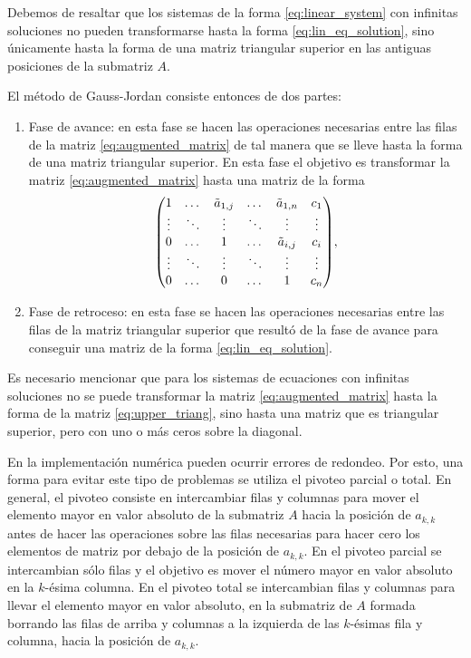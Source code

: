 \documentclass[11pt,letterpaper]{article}
\begin{document}
Debemos de resaltar que los sistemas de la forma 
\eqref{eq:linear_system} con infinitas soluciones no pueden transformarse hasta la 
forma \eqref{eq:lin_eq_solution}, sino únicamente hasta la forma de una
matriz triangular superior en las antiguas posiciones de la submatriz $A$.

El método de Gauss-Jordan consiste entonces de dos partes:
\begin{enumerate}
\item Fase de avance: en esta fase se hacen las operaciones necesarias
entre las filas de la matriz \eqref{eq:augmented_matrix} de tal manera que
se lleve hasta la forma de una matriz triangular superior. En esta fase el objetivo
es transformar la matriz \eqref{eq:augmented_matrix} hasta una matriz 
de la forma 
\begin{align}\label{eq:upper_triang}
\mqty(1&\dots&\tilde{a}_{1,j}&\dots&\tilde{a}_{1,n}&c_1\\
\vdots&\ddots&\vdots&\ddots&\vdots&\vdots\\
0&\dots&1&\dots&\tilde{a}_{i,j}&c_i\\
\vdots&\ddots&\vdots&\ddots&\vdots&\vdots\\
0&\dots&0&\dots&1&c_n),
\end{align}
\item Fase de retroceso: en esta fase se hacen las operaciones necesarias
entre las filas de la matriz triangular superior que resultó de la fase de avance
para conseguir una matriz de la forma \eqref{eq:lin_eq_solution}. 
\end{enumerate}
Es necesario mencionar que para los sistemas de ecuaciones con infinitas 
soluciones no se puede transformar la matriz \eqref{eq:augmented_matrix}
hasta la forma de la matriz \eqref{eq:upper_triang}, sino hasta una matriz
que es triangular superior, pero con uno o más ceros sobre la diagonal. 

En la implementación numérica pueden ocurrir errores de redondeo. 
Por esto, una forma para evitar este tipo de problemas se utiliza
el pivoteo parcial o total. En general, el pivoteo consiste en intercambiar
filas y columnas para mover el elemento mayor en valor absoluto de la 
submatriz $A$ hacia la posición de $a_{k,k}$ antes de hacer las operaciones
sobre las filas necesarias para hacer cero los elementos de matriz por
debajo de la posición de  $a_{k,k}$. En el pivoteo parcial 
se intercambian sólo filas y el objetivo es mover el número mayor en 
valor absoluto en la $k$-ésima columna. En el pivoteo 
total se intercambian filas y columnas para llevar el elemento mayor en valor absoluto,
en la submatriz de $A$ formada borrando las filas de arriba y columnas a la
izquierda de las $k$-ésimas fila y columna, hacia la posición de $a_{k,k}$.
\end{document}
